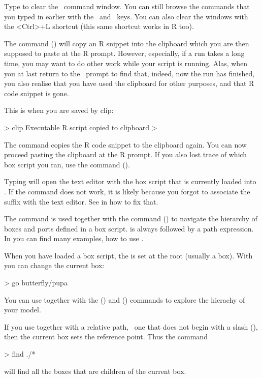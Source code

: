 Type  to clear the \US\ command window. You can still browse the commands that you typed in earlier with the \upkey\ and  \downkey\ keys. You can also clear the windows with the <Ctrl>+L shortcut (this same shortcut works in R too).

The  command () will copy an R snippet into the clipboard which you are then supposed to paste at the R prompt. However, especially, if a run takes a long time, you may want to do other work while your script is running. Alas, when you at last return to the \US\ prompt to find that, indeed, now the run has finished, you also realise that you have used the clipboard for other purposes, and that R code snippet is gone.

This is when you are saved by clip:
\begin{usdialog}
> clip
Executable R script copied to clipboard
>
\end{usdialog}
The  command copies the R code snippet to the clipboard again. You can now proceed pasting the clipboard at the R prompt. If you also lost trace of which box script you ran, use the  command ().

Typing  will open the text editor with the box script that is currently loaded into \US. If the command does not work, it is likely because you forgot to associate the  suffix with the text editor. See in  how to fix that.

The  command is used together with the  command () to navigate the hierarchy of boxes and ports defined in a box script.  is always followed by a path expression. In  you can find many examples, how to use .

When you have loaded a box script, the  is set at the root (usually a  box). With  you can change the current box:
\begin{usdialog}
> go butterfly/pupa
\end{usdialog}
You can use  together with the  () and  () commands to explore the hierachy of your model. 

If you use  together with a relative path, \ie\ one that does not begin with a slash (\code{/}), then the current box sets the reference point. Thus the command
\begin{usdialog}
> find ./*
\end{usdialog}
will find all the boxes that are children of the current box.

